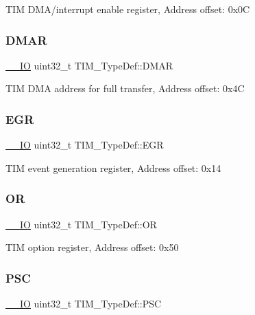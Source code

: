 T\+IM D\+M\+A/interrupt enable register, Address offset\+: 0x0C \mbox{\label{struct_t_i_m___type_def_afb7114ac49dba07ba5d250c507dbf23d}} 
\subsubsection{\texorpdfstring{D\+M\+AR}{DMAR}}
{\footnotesize\ttfamily \hyperlink{core__sc300_8h_aec43007d9998a0a0e01faede4133d6be}{\+\_\+\+\_\+\+IO} uint32\+\_\+t T\+I\+M\+\_\+\+Type\+Def\+::\+D\+M\+AR}

T\+IM D\+MA address for full transfer, Address offset\+: 0x4C \mbox{\label{struct_t_i_m___type_def_a04248d87f48303fd2267810104a7878d}} 
\subsubsection{\texorpdfstring{E\+GR}{EGR}}
{\footnotesize\ttfamily \hyperlink{core__sc300_8h_aec43007d9998a0a0e01faede4133d6be}{\+\_\+\+\_\+\+IO} uint32\+\_\+t T\+I\+M\+\_\+\+Type\+Def\+::\+E\+GR}

T\+IM event generation register, Address offset\+: 0x14 \mbox{\label{struct_t_i_m___type_def_acb0e8a4efa46dac4a2fb1aa3d45924fd}} 
\subsubsection{\texorpdfstring{OR}{OR}}
{\footnotesize\ttfamily \hyperlink{core__sc300_8h_aec43007d9998a0a0e01faede4133d6be}{\+\_\+\+\_\+\+IO} uint32\+\_\+t T\+I\+M\+\_\+\+Type\+Def\+::\+OR}

T\+IM option register, Address offset\+: 0x50 \mbox{\label{struct_t_i_m___type_def_ad03c852f58077a11e75f8af42fa6d921}} 
\subsubsection{\texorpdfstring{P\+SC}{PSC}}
{\footnotesize\ttfamily \hyperlink{core__sc300_8h_aec43007d9998a0a0e01faede4133d6be}{\+\_\+\+\_\+\+IO} uint32\+\_\+t T\+I\+M\+\_\+\+Type\+Def\+::\+P\+SC}

